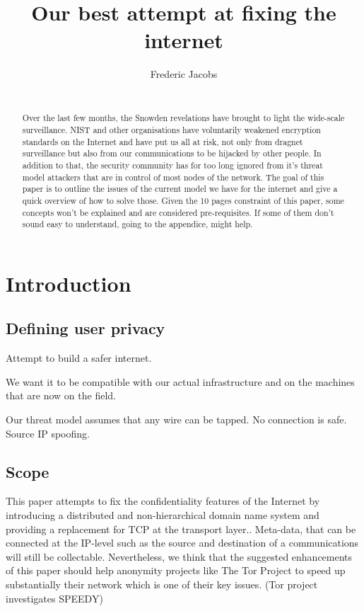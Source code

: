 \documentclass{vldb}
\begin{document}
\title{Our best attempt at fixing the internet}



\author{
\alignauthor
Frederic Jacobs\\
\\
}

\maketitle

\begin{abstract}
Over the last few months, the Snowden revelations have brought to light the wide-scale surveillance. NIST and other organisations have voluntarily weakened encryption standards on the Internet and have put us all at risk, not only from dragnet surveillance but also from our communications to be hijacked by other people.
In addition to that, the security community has for too long ignored from it's threat model attackers that are in control of most nodes of the network. The goal of this paper is to outline the issues of the current model we have for the internet and give a quick overview of how to solve those. Given the 10 pages constraint of this paper, some concepts won't be explained and are considered pre-requisites. If some of them don't sound easy to understand, going to the appendice, might help. 
\end{abstract}

\section{Introduction}

\subsection{Defining user privacy}
Attempt to build a safer internet.

We want it to be compatible with our actual infrastructure and on the machines that are now on the field.

Our threat model assumes that any wire can be tapped. No connection is safe. Source IP spoofing.

\subsection{Scope}
This paper attempts to fix the confidentiality features of the Internet by introducing a distributed and non-hierarchical domain name system and providing a replacement for TCP at the transport layer.. Meta-data, that can be connected at the IP-level such as the source and destination of a communications will still be collectable. Nevertheless, we think that the suggested enhancements of this paper should help anonymity projects like The Tor Project to speed up substantially their network which is one of their key issues. (Tor project investigates SPEEDY)
\end{document}
